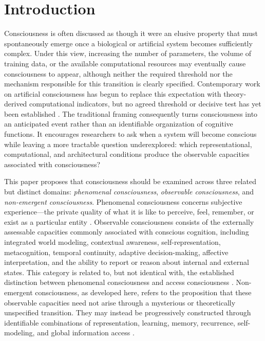 \section{\textbf{Introduction}}
\label{sec:introduction}

Consciousness is often discussed as though it were an elusive property that must spontaneously emerge once a biological or artificial system becomes sufficiently complex. Under this view, increasing the number of parameters, the volume of training data, or the available computational resources may eventually cause consciousness to appear, although neither the required threshold nor the mechanism responsible for this transition is clearly specified. Contemporary work on artificial consciousness has begun to replace this expectation with theory-derived computational indicators, but no agreed threshold or decisive test has yet been established \cite{butlin2023consciousness,chalmers2023llm}. The traditional framing consequently turns consciousness into an anticipated event rather than an identifiable organization of cognitive functions. It encourages researchers to ask when a system will become conscious while leaving a more tractable question underexplored: which representational, computational, and architectural conditions produce the observable capacities associated with consciousness?

This paper proposes that consciousness should be examined across three related but distinct domains: \emph{phenomenal consciousness}, \emph{observable consciousness}, and \emph{non-emergent consciousness}. Phenomenal consciousness concerns subjective experience---the private quality of what it is like to perceive, feel, remember, or exist as a particular entity \cite{nagel1974what,chalmers1995facing}. Observable consciousness consists of the externally assessable capacities commonly associated with conscious cognition, including integrated world modeling, contextual awareness, self-representation, metacognition, temporal continuity, adaptive decision-making, affective interpretation, and the ability to report or reason about internal and external states. This category is related to, but not identical with, the established distinction between phenomenal consciousness and access consciousness \cite{block1995confusion}. Non-emergent consciousness, as developed here, refers to the proposition that these observable capacities need not arise through a mysterious or theoretically unspecified transition. They may instead be progressively constructed through identifiable combinations of representation, learning, memory, recurrence, self-modeling, and global information access \cite{baars1988cognitive,dehaene2011experimental,mashour2020conscious}.

